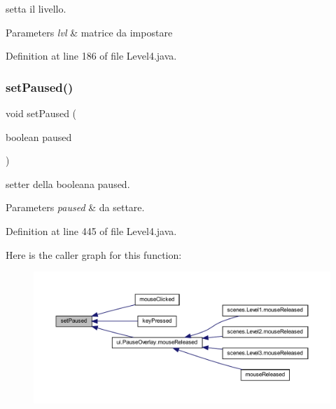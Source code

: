setta il livello. 


\begin{DoxyParams}{Parameters}
{\em lvl} & matrice da impostare \\
\hline
\end{DoxyParams}


Definition at line 186 of file Level4.\+java.

\mbox{\label{classscenes_1_1_level4_aeab1551e3e372c6402076c04ea9002bb}} 
\subsubsection{\texorpdfstring{set\+Paused()}{setPaused()}}
{\footnotesize\ttfamily void set\+Paused (\begin{DoxyParamCaption}\item[{boolean}]{paused }\end{DoxyParamCaption})}



setter della booleana paused. 


\begin{DoxyParams}{Parameters}
{\em paused} & da settare. \\
\hline
\end{DoxyParams}


Definition at line 445 of file Level4.\+java.

Here is the caller graph for this function\+:\nopagebreak
\begin{figure}[H]
\begin{center}
\leavevmode
\includegraphics[width=350pt]{classscenes_1_1_level4_aeab1551e3e372c6402076c04ea9002bb_icgraph}
\end{center}
\end{figure}
\mbox{\label{classscenes_1_1_level4_ac9525f397417cae10d3de076f5b2e9d3}} 
